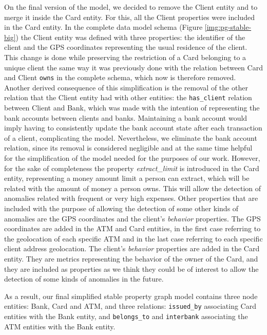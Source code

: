 On the final version of the model, we decided to remove the Client entity and to merge it inside the Card entity. For this, all the Client properties were included in the Card entity. In the complete data model schema (Figure \ref{img:pg-stable-big}) the Client entity was defined with three properties: the identifier of the client and the GPS coordinates representing the usual residence of the client. This change is done while preserving the restriction of a Card belonging to a unique client the same way it was previously done with the relation between Card and Client \texttt{owns} in the complete schema, which now is therefore removed. \\
Another derived consequence of this simplification is the removal of the other relation that the Client entity had with other entities: the \texttt{has\_client} relation between Client and Bank, which was made with the intention of representing the bank accounts between clients and banks. Maintaining a bank account would imply having to consistently update the bank account state after each transaction of a client, complicating the model. Nevertheless, we eliminate the bank account relation, since its removal is considered negligible and at the same time helpful for the simplification of the model needed for the purposes of our work. %
However, for the sake of completeness the property \textit{extract\_limit} is introduced in the Card entity, representing a money amount limit a person can extract, which will be related with the amount of money a person owns. This will allow the detection of anomalies related with frequent or very high expenses. Other properties that are included with the purpose of allowing the detection of some other kinds of anomalies are the GPS coordinates and the client's \emph{behavior} properties. The GPS coordinates are added in the ATM and Card entities, in the first case referring to the geolocation of each specific ATM and in the last case referring to each specific client address geolocation. The client's \emph{behavior} properties are added in the Card entity. They are metrics representing the behavior of the owner of the Card, and they are included as properties as we think they could be of interest to allow the detection of some kinds of anomalies in the future.

As a result, our final simplified stable property graph model contains three node entities: Bank, Card and ATM, and three relations: \texttt{issued\_by} associating Card entities with the Bank entity, and \texttt{belongs\_to} and \texttt{interbank} associating the ATM entities with the Bank entity. 

